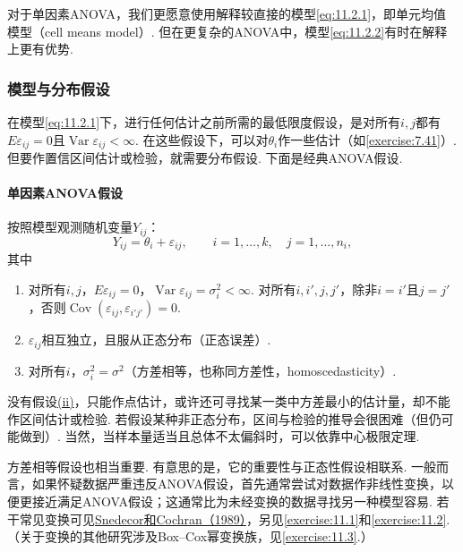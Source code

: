 对于单因素ANOVA，我们更愿意使用解释较直接的模型\eqref{eq:11.2.1}，即单元均值模型（cell means model）. 但在更复杂的ANOVA中，模型\eqref{eq:11.2.2}有时在解释上更有优势.

\subsubsection{模型与分布假设}\label{sec:11.2.1}
在模型\eqref{eq:11.2.1}下，进行任何估计之前所需的最低限度假设，是对所有$i,j$都有$E\varepsilon_{ij}=0$且$\operatorname{Var}\varepsilon_{ij}<\infty$. 在这些假设下，可以对$\theta_i$作一些估计（如\autoref{exercise:7.41}）. 但要作置信区间估计或检验，就需要分布假设. 下面是经典ANOVA假设.

\paragraph{单因素ANOVA假设}
按照模型观测随机变量$Y_{ij}$：
$$
Y_{ij}=\theta_i+\varepsilon_{ij},\qquad i=1,\ldots,k,\quad j=1,\ldots,n_i,
$$
其中
\begin{enumerate}[label=(\roman*)]
\item\label{item:11.2.assumption.i} 对所有$i,j$，$E\varepsilon_{ij}=0$，$\operatorname{Var}\varepsilon_{ij}=\sigma_i^2<\infty$. 对所有$i,i',j,j'$，除非$i=i'$且$j=j'$，否则$\operatorname{Cov}(\varepsilon_{ij},\varepsilon_{i'j'})=0$.
\item\label{item:11.2.assumption.ii} $\varepsilon_{ij}$相互独立，且服从正态分布（正态误差）.
\item\label{item:11.2.assumption.iii} 对所有$i$，$\sigma_i^2=\sigma^2$（方差相等，也称同方差性，homoscedasticity）.
\end{enumerate}
没有假设\hyperref[item:11.2.assumption.ii]{(ii)}，只能作点估计，或许还可寻找某一类中方差最小的估计量，却不能作区间估计或检验. 若假设某种非正态分布，区间与检验的推导会很困难（但仍可能做到）. 当然，当样本量适当且总体不太偏斜时，可以依靠中心极限定理.

方差相等假设也相当重要. 有意思的是，它的重要性与正态性假设相联系. 一般而言，如果怀疑数据严重违反ANOVA假设，首先通常尝试对数据作非线性变换，以便更接近满足ANOVA假设；这通常比为未经变换的数据寻找另一种模型容易. 若干常见变换可见\hyperref[bib:source294]{Snedecor和Cochran（1989）}，另见\autoref{exercise:11.1}和\autoref{exercise:11.2}. （关于变换的其他研究涉及Box--Cox幂变换族，见\autoref{exercise:11.3}.）

